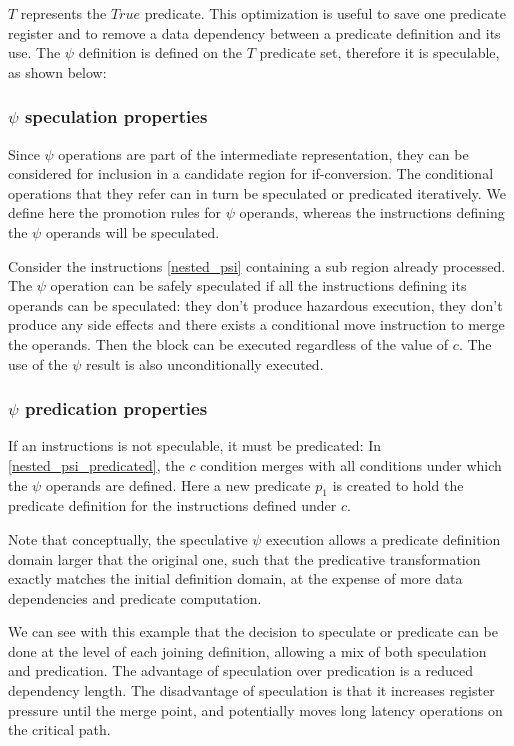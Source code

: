 $T$ represents the $True$ predicate. This optimization is useful to save one predicate register and to remove a data dependency between a predicate definition and its use. 
The $\psi$ definition is defined on the $T$ predicate set, therefore it is speculable, as shown below:

\subsubsection{$\psi$ speculation properties}

Since $\psi$ operations are part of the intermediate representation, they can be considered for inclusion in a candidate region for if-conversion. The conditional operations that they refer can in turn be speculated or predicated iteratively. We define here the promotion rules for $\psi$ operands, whereas the instructions defining the $\psi$ operands will be speculated.

Consider the instructions \ref{nested_psi} containing a sub region already processed. The $\psi$ operation can be safely speculated if all the instructions defining its operands can be speculated: they don't produce hazardous execution, they don't produce any side effects and there exists a conditional move instruction to merge the operands. Then the block can be executed regardless of the value of $c$. The use of the $\psi$ result is also unconditionally executed.

\subsubsection{$\psi$ predication properties}

If an instructions is not speculable, it must be predicated:
In \ref{nested_psi_predicated}, the $c$ condition merges with all conditions under which the $\psi$ operands are defined. Here a new predicate $p_1$ is created to hold the predicate definition for the instructions defined under $c$. 

Note that conceptually, the speculative $\psi$ execution allows a predicate definition domain larger that the original one, such that the predicative transformation exactly matches the initial definition domain, at the expense of more data dependencies and predicate computation.

We can see with this example that the decision to speculate or predicate can be done at the level of each joining definition, allowing a mix of both speculation and predication. The advantage of speculation over predication is a reduced dependency length. The disadvantage of speculation is that it increases register pressure until the merge point, and potentially moves long latency operations on the critical path.
 
